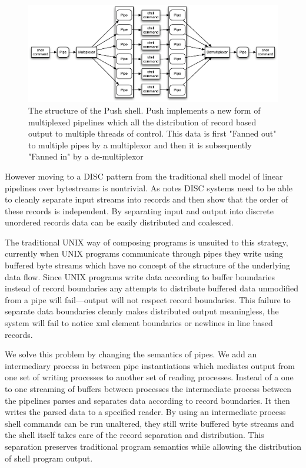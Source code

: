 \documentclass[11pt, letterpaper]{article}
\begin{document}
\begin{figure}[htp]
\centering
\includegraphics[width=4.5in]{pipestruct.eps}
\caption{The structure of the Push shell. Push implements a new form of multiplexed pipelines which all the distribution of record based output to multiple threads of control. This data is first "Fanned out" to multiple pipes by a multiplexor and then it is subsequently "Fanned in" by a de-multiplexor}\label{fig:pipestruct} 
\end{figure}

However moving to a DISC pattern from the traditional shell model of linear pipelines over bytestreams is nontrivial. 
As \cite{pike2005idp} notes DISC systems need to be able to cleanly separate input streams into records and then show that the order of these records is independent. By separating input and output into discrete unordered records data can be easily distributed and coalesced.

The traditional UNIX way of composing programs is unsuited to this strategy, currently when UNIX programs communicate through pipes they write using buffered byte streams which have no concept of the structure of the underlying data flow. Since UNIX programs write data according to buffer boundaries instead of record boundaries any attempts to distribute buffered data unmodified from a pipe will fail---output will not respect record boundaries. This failure to separate data boundaries cleanly makes distributed output meaningless, the system will fail to notice xml element boundaries or newlines in line based records. 

We solve this problem by changing the semantics of pipes.  We add an intermediary process in between pipe instantiations which mediates output from one set of writing processes to another set of reading processes. Instead of a one to one streaming of buffers between processes the intermediate process between the pipelines parses and separates data according to record boundaries. It then writes the parsed data to a specified reader. By using an intermediate process shell commands can be run unaltered, they still write buffered byte streams and the shell itself takes care of the record separation and distribution. This separation preserves traditional program semantics while allowing the distribution of shell program output.
\end{document}
